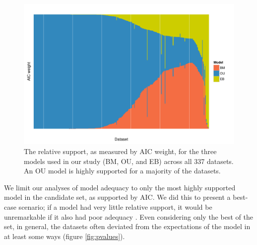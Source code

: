 \begin{figure}[p]
  \centering
  \includegraphics[angle=90, origin=c, scale=0.8]{figs/aic-support}
  \caption[Relative support for models across angiosperm datasets (ML)]{The relative support, as measured by AIC weight, for the three models used in our study (BM, OU, and EB) across all 337 datasets. An OU model is highly supported for a majority of the datasets.}
  \label{fig:aic-support}
\end{figure}

We limit our analyses of model adequacy to only the most highly supported model in the candidate set, as supported by AIC. We did this to present a best-case scenario; if a model had very little relative support, it would be unremarkable if it also had poor adequacy \citep[but see][]{Ripplinger2010}. Even considering only the best of the set, in general, the datasets often deviated from the expectations of the model in at least some ways (figure \ref{fig:pvalues}).

